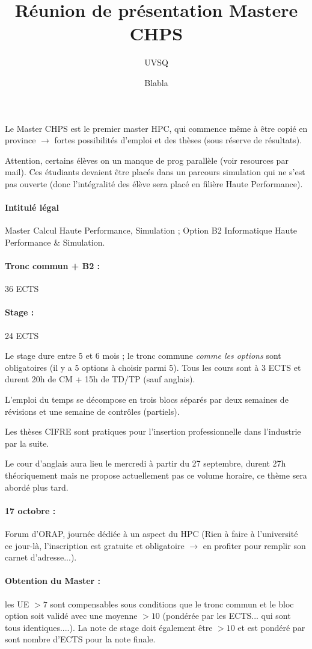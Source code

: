 \documentclass{article}
\title{Réunion de présentation Mastere CHPS}
\author{UVSQ \and Blabla}
\date{}
\begin{document}
Le Master CHPS est le premier master HPC, qui commence même à être copié en province $\to$ fortes possibilités d'emploi et des thèses (sous réserve de résultats).
\bigskip

Attention, certains élèves on un manque de prog parallèle (voir resources par mail). Ces étudiants devaient être placés dans un parcours simulation qui ne s'est pas ouverte (donc l'intégralité des élève sera placé en filière Haute Performance).

\paragraph{Intitulé légal} Master Calcul Haute Performance, Simulation ; Option B2 Informatique Haute Performance \& Simulation.
\bigskip

\paragraph{Tronc commun + B2 :} 36 ECTS
\paragraph{Stage :} 24 ECTS
\bigskip

Le stage dure entre 5 et 6 mois ; le tronc commune \emph{comme les options} sont obligatoires (il y a 5 options à choisir parmi 5). Tous les cours sont à 3 ECTS et durent 20h de CM + 15h de TD/TP (sauf anglais).

L'emploi du temps se décompose en trois blocs séparés par deux semaines de révisions et une semaine de contrôles (partiels).

Les thèses CIFRE sont pratiques pour l'insertion professionnelle dans l'industrie par la suite.

Le cour d'anglais aura lieu le mercredi à partir du 27 septembre, durent 27h théoriquement mais ne propose actuellement pas ce volume horaire, ce thème sera abordé plus tard.

\paragraph{17 octobre :} Forum d'ORAP, journée dédiée à un aspect du HPC (Rien à faire à l'université ce jour-là, l'inscription est gratuite et obligatoire $\to$ en profiter pour remplir son carnet d'adresse...).

\paragraph{Obtention du Master :} les UE $>7$ sont compensables sous conditions que le tronc commun et le bloc option soit validé avec une moyenne $>10$ (pondérée par les ECTS... qui sont tous identiques....). La note de stage doit également être $>10$ et est pondéré par sont nombre d'ECTS pour la note finale.
\end{document}
